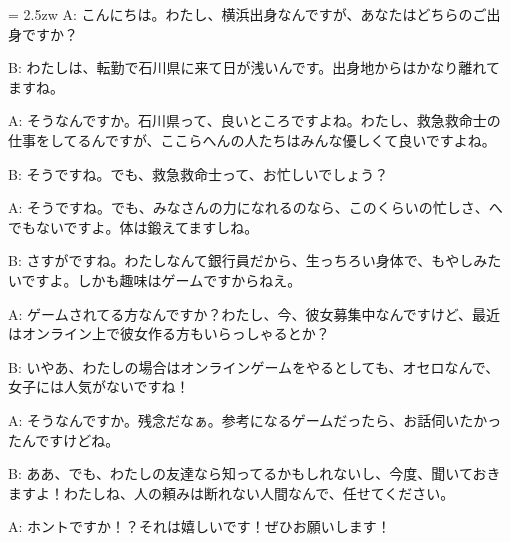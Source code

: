 \documentclass[11pt]{amsart}
\title{}
\author{}
\newenvironment{hangall}[1]{\hangindent = 2.5zw\everypar{\hangindent = 2.5zw}}{}
\begin{document}
\maketitle
\begin{hangall}{}%
A: こんにちは。わたし、横浜出身なんですが、あなたはどちらのご出身ですか？

B: わたしは、転勤で石川県に来て日が浅いんです。出身地からはかなり離れてますね。

A: そうなんですか。石川県って、良いところですよね。わたし、救急救命士の仕事をしてるんですが、ここらへんの人たちはみんな優しくて良いですよね。

B: そうですね。でも、救急救命士って、お忙しいでしょう？

A: そうですね。でも、みなさんの力になれるのなら、このくらいの忙しさ、へでもないですよ。体は鍛えてますしね。

B: さすがですね。わたしなんて銀行員だから、生っちろい身体で、もやしみたいですよ。しかも趣味はゲームですからねえ。

A: ゲームされてる方なんですか？わたし、今、彼女募集中なんですけど、最近はオンライン上で彼女作る方もいらっしゃるとか？

B: いやあ、わたしの場合はオンラインゲームをやるとしても、オセロなんで、女子には人気がないですね！

A: そうなんですか。残念だなぁ。参考になるゲームだったら、お話伺いたかったんですけどね。

B: ああ、でも、わたしの友達なら知ってるかもしれないし、今度、聞いておきますよ！わたしね、人の頼みは断れない人間なんで、任せてください。

A: ホントですか！？それは嬉しいです！ぜひお願いします！
\end{hangall}
\end{document}
